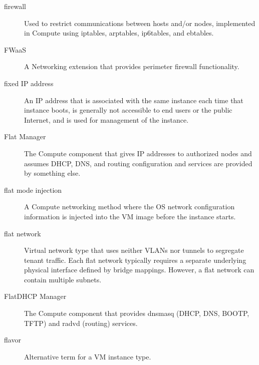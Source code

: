 \documentclass[letterpaper,10pt,english]{sphinxmanual}
\begin{document}
\begin{description}
\item[{firewall}] \leavevmode{}\label{_source/glossary:term-firewall}
Used to restrict communications between hosts and/or nodes,
implemented in Compute using iptables, arptables, ip6tables, and
ebtables.

\item[{FWaaS}] \leavevmode{}\label{_source/glossary:term-fwaas}
A Networking extension that provides perimeter firewall
functionality.

\item[{fixed IP address}] \leavevmode{}\label{_source/glossary:term-fixed-ip-address}
An IP address that is associated with the same instance each
time that instance boots, is generally not accessible to end users or
the public Internet, and is used for management of the
instance.

\item[{Flat Manager}] \leavevmode{}\label{_source/glossary:term-flat-manager}
The Compute component that gives IP addresses to authorized
nodes and assumes DHCP, DNS, and routing configuration and services
are provided by something else.

\item[{flat mode injection}] \leavevmode{}\label{_source/glossary:term-flat-mode-injection}
A Compute networking method where the OS network configuration
information is injected into the VM image before the instance
starts.

\item[{flat network}] \leavevmode{}\label{_source/glossary:term-flat-network}
Virtual network type that uses neither VLANs nor tunnels to
segregate tenant traffic. Each flat network typically requires
a separate underlying physical interface defined by bridge
mappings. However, a flat network can contain multiple
subnets.

\item[{FlatDHCP Manager}] \leavevmode{}\label{_source/glossary:term-flatdhcp-manager}
The Compute component that provides dnsmasq (DHCP, DNS, BOOTP,
TFTP) and radvd (routing) services.

\item[{flavor}] \leavevmode{}\label{_source/glossary:term-flavor}
Alternative term for a VM instance type.


\end{description}
\end{document}
